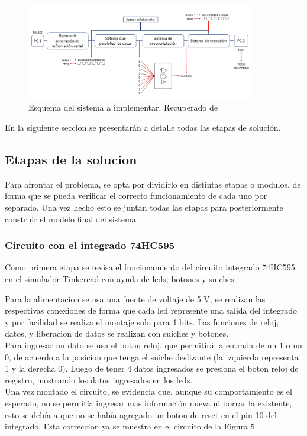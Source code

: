 \documentclass{article}
\begin{document}
\begin{figure}[!ht]
\includegraphics[width=10cm]{esquema.PNG}
\centering
\caption{Esquema del sistema a implementar. Recuperado de \cite{augusto}}
\end{figure}

En la siguiente seccion se presentarán a detalle todas las etapas de solución.

\subsection{Etapas de la solucion}

Para afrontar el problema, se opta por dividirlo en distintas etapas o modulos, de forma que se pueda verificar el correcto funcionamiento de cada uno por separado. Una vez hecho esto se juntan todas las etapas para posteriormente construir el modelo final del sistema.\\
\subsubsection{Circuito con el integrado 74HC595}

Como primera etapa se revisa el funcionamiento del circuito integrado 74HC595 en el simulador Tinkercad con ayuda de leds, botones y suiches. 

Para la alimentacion se usa una fuente de voltaje de 5 V, se realizan las respectivas conexiones de forma que cada led represente una salida del integrado y por facilidad se realiza el montaje solo para 4 bits. Las funciones de reloj, datos, y liberacion de datos se realizan con suiches y botones.\\

Para ingresar un dato se usa el boton reloj, que permitirá la entrada de un 1 o un 0, de acuerdo a la posicion que tenga el suiche deslizante (la izquierda representa 1 y la derecha 0). Luego de tener 4 datos ingresados se presiona el boton reloj de registro, mostrando los datos ingresados en los leds.\\

Una vez montado el circuito, se evidencia que, aunque su comportamiento es el esperado, no se permitía ingresar mas información nueva ni borrar la existente, esto se debía a que no se había agregado un boton de reset en el pin 10 del integrado. Esta correccion ya se muestra en el circuito de la Figura 5.\\
\end{document}
